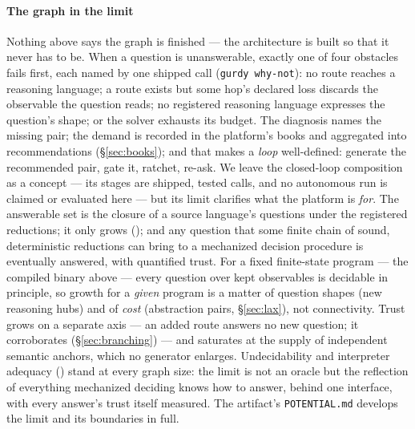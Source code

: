 \paragraph{The graph in the limit}
Nothing above says the graph is finished --- the architecture is built
so that it never has to be. When a question is unanswerable, exactly
one of four obstacles fails first, each named by one shipped call
(\texttt{gurdy why-not}): no route reaches a reasoning language; a
route exists but some hop's declared loss discards the observable the
question reads; no registered reasoning language expresses the
question's shape; or the solver exhausts its budget. The diagnosis
names the missing pair; the demand is recorded in the platform's
books and aggregated into recommendations (\S\ref{sec:books}); and
that makes a \emph{loop} well-defined: generate the recommended pair,
gate it, ratchet, re-ask. We leave the closed-loop composition as a
concept --- its stages are shipped, tested calls, and no autonomous
run is claimed or evaluated here --- but its limit
clarifies what the platform is \emph{for}. The answerable set is the
closure of a source language's questions under the registered
reductions; it only grows (); and any question that
some finite chain of sound, deterministic reductions can bring to a
mechanized decision procedure is eventually answered, with quantified
trust. For a fixed finite-state program --- the compiled binary
above --- every question over kept observables is decidable in
principle, so growth for a \emph{given} program is a matter of
question shapes (new reasoning hubs) and of \emph{cost} (abstraction
pairs, \S\ref{sec:lax}), not connectivity. Trust grows on a separate
axis --- an added route answers no new question; it corroborates
(\S\ref{sec:branching}) --- and saturates at the supply of independent
semantic anchors, which no generator enlarges. Undecidability and
interpreter adequacy () stand at every graph size:
the limit is not an oracle but the reflection of everything mechanized
deciding knows how to answer, behind one interface, with every
answer's trust itself measured. The artifact's \texttt{POTENTIAL.md}
develops the limit and its boundaries in full.
